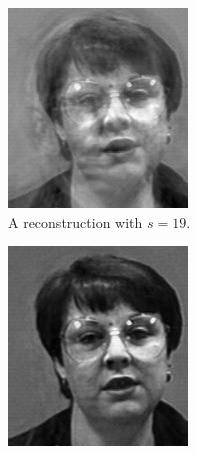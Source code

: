 \begin{figure}[H]
\begin{subfigure}{0.32\textwidth}
    \includegraphics[width=\textwidth]{figures/rebuiltEighth.png}
    \caption{A reconstruction with $s=19$.}
\end{subfigure}
\begin{subfigure}{0.32\textwidth}
    \includegraphics[width=\textwidth]{figures/rebuiltHalf.png}

\end{subfigure}
\end{figure}
